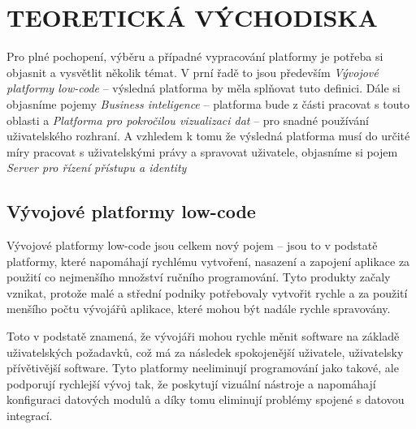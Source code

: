 \chapter{TEORETICKÁ VÝCHODISKA}
\par Pro plné pochopení, výběru a případné vypracování platformy je potřeba si objasnit a vysvětlit několik témat. V prní řadě to jsou především \textit{Vývojové platformy low-code} -- výsledná platforma by měla splňovat tuto definici. Dále si objasníme pojemy \textit{Business inteligence} -- platforma bude z části pracovat s touto oblasti a \textit{Platforma pro pokročilou vizualizaci dat} -- pro snadné používání uživatelského rozhraní. A vzhledem k tomu že výsledná platforma musí do určité míry pracovat s uživatelskými právy a spravovat uživatele, objasníme si pojem \textit{Server pro řízení přístupu a identity}

\section{Vývojové platformy low-code}
\par Vývojové platformy low-code jsou celkem nový pojem -- jsou to v podstatě platformy, které napomáhají rychlému vytvoření, nasazení a zapojení aplikace za použití co nejmenšího množství ručního programování. Tyto produkty začaly vznikat, protože malé a střední podniky potřebovaly vytvořit rychle a za použití menšího počtu vývojářů aplikace, které mohou být nadále rychle spravovány. \cite{pcmag-no-coding}

\par Toto v podstatě znamená, že vývojáři mohou rychle měnit software na základě uživatelských požadavků, což má za následek spokojenější uživatele, uživatelsky přívětivější software. Tyto platformy neeliminují programování jako takové, ale podporují rychlejší vývoj tak, že poskytují vizuální nástroje a napomáhají konfiguraci datových modulů a díky tomu eliminují problémy spojené s datovou integrací. \cite{low-code-customer-want}

